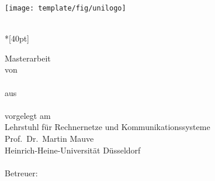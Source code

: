 \begin{titlepage}
	\centering
	\texttt{[image: template/fig/unilogo]}

	\vfill
	\Huge
	\thesistitle{}\\*[40pt]
	\normalsize

	\vfill
	\Large
	Masterarbeit\\[0.25em]
	\large
	von\\[5mm]
	\huge
	\thesisauthor{}\\

	\vspace{5mm}
	\large
	aus\\ \thesisauthorbirthplace{}\\[1cm]
	vorgelegt am\\[5mm]
	Lehrstuhl für Rechnernetze und Kommunikationssysteme\\
	Prof.\ Dr.\ Martin Mauve\\ 
	Heinrich-Heine-Universität Düsseldorf\\[0.5cm]
	\thesissubmissionmonth{} \thesissubmissionyear{}\\[0.5cm]
	Betreuer:\\
	\thesissupervisor{}
\end{titlepage}

